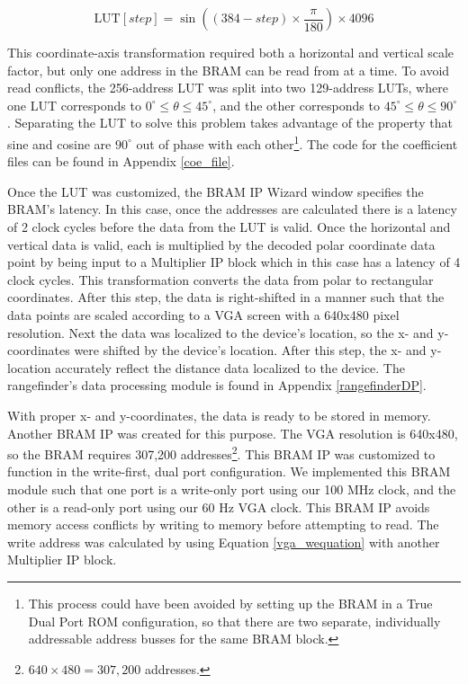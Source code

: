 \begin{equation}
	\textrm{LUT}[step] = \sin((384-step)\times\dfrac{\pi}{180})\times4096
	\label{coe}
\end{equation}

This coordinate-axis transformation required both a horizontal and vertical scale factor, but only one address in the BRAM can be read from at a time. To avoid read conflicts, the 256-address LUT was split into two 129-address LUTs, where one LUT corresponds to $0^\circ{}\leq{}\theta{}\leq45^\circ$, and the other corresponds to $45^\circ{}\leq{}\theta{}\leq90^\circ$. Separating the LUT to solve this problem takes advantage of the property that sine and cosine are $90^\circ$ out of phase with each other\footnote{This process could have been avoided by setting up the BRAM in a True Dual Port ROM configuration, so that there are two separate, individually addressable address busses for the same BRAM block.}. The code for the coefficient files can be found in Appendix \ref{coe_file}.
\par
Once the LUT was customized, the BRAM IP Wizard window specifies the BRAM's latency. In this case, once the addresses are calculated there is a latency of 2 clock cycles before the data from the LUT is valid. Once the horizontal and vertical data is valid, each is multiplied by the decoded polar coordinate data point by being input to a Multiplier IP block which in this case has a latency of 4 clock cycles. This transformation converts the data from polar to rectangular coordinates. After this step, the data is right-shifted in a manner such that the data points are scaled according to a VGA screen with a 640x480 pixel resolution. Next the data was localized to the device's location, so the x- and y-coordinates were shifted by the device's location. After this step, the x- and y-location accurately reflect the distance data localized to the device. The rangefinder's data processing module is found in Appendix \ref{rangefinderDP}.
\par
With proper x- and y-coordinates, the data is ready to be stored in memory. Another BRAM IP was created for this purpose. The VGA resolution is 640x480, so the BRAM requires 307,200 addresses\footnote{$640\times480 = 307,200$ addresses.}. This BRAM IP was customized to function in the write-first, dual port configuration. We implemented this BRAM module such that one port is a write-only port using our 100 MHz clock, and the other is a read-only port using our 60 Hz VGA clock. This BRAM IP avoids memory access conflicts by writing to memory before attempting to read. The write address was calculated by using Equation \ref{vga_wequation} with another Multiplier IP block.


